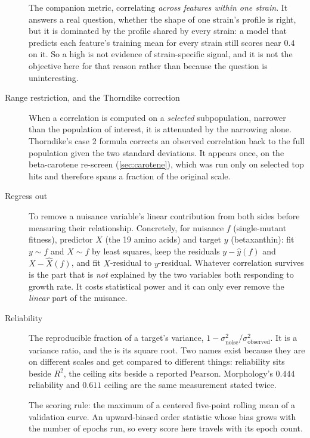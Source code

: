 \begin{description}
\item[] The companion metric, correlating \emph{across features
  within one strain}. It answers a real question, whether the shape of one strain's profile
  is right, but it is dominated by the profile shared by every strain: a model that predicts
  each feature's training mean for every strain still scores near $0.4$ on it. So a high
   is not evidence of strain-specific signal, and it is not the
  objective here for that reason rather than because the question is uninteresting.

\item[Range restriction, and the Thorndike correction] When a correlation is computed on a
  \emph{selected} subpopulation, narrower than the population of interest, it is attenuated
  by the narrowing alone. Thorndike's case 2 formula corrects an observed correlation back
  to the full population given the two standard deviations. It appears once, on the
  beta-carotene re-screen (\cref{sec:carotene}), which was run only on selected top hits and
  therefore spans a fraction of the original scale.

\item[Regress out] To remove a nuisance variable's linear contribution from both sides
  before measuring their relationship. Concretely, for nuisance $f$ (single-mutant fitness),
  predictor $X$ (the 19 amino acids) and target $y$ (betaxanthin): fit $y \sim f$ and
  $X \sim f$ by least squares, keep the residuals $y - \hat y(f)$ and $X - \hat X(f)$, and
  fit $X$-residual to $y$-residual. Whatever correlation survives is the part that is
  \emph{not} explained by the two variables both responding to growth rate. It costs
  statistical power and it can only ever remove the \emph{linear} part of the nuisance.

\item[Reliability] The reproducible fraction of a target's variance,
  $1 - \sigma^2_{\text{noise}} / \sigma^2_{\text{observed}}$. It is a variance ratio, and the
   is its square root. Two names exist because they are on different scales
  and get compared to different things: reliability sits beside $R^2$, the ceiling sits
  beside a reported Pearson. Morphology's $0.444$ reliability and $0.611$ ceiling are the
  same measurement stated twice.

\item[] The scoring rule: the maximum of a centered five-point rolling mean
  of a validation curve. An upward-biased order statistic whose bias grows with the number
  of epochs run, so every score here travels with its epoch count.


\end{description}
